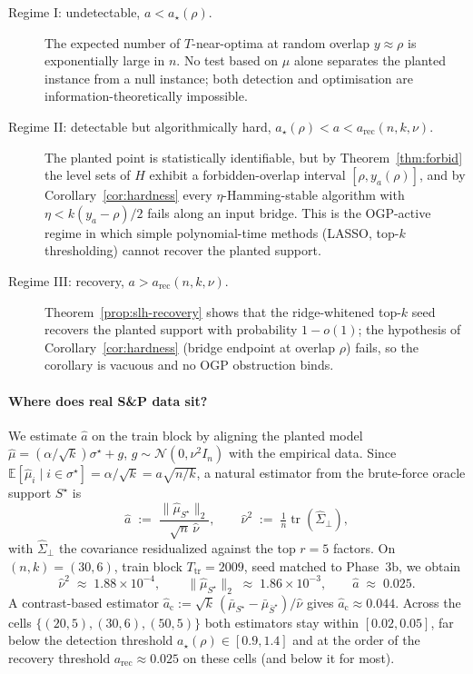\begin{description}
  \item[Regime I: undetectable, $a < a_\star(\rho)$.]
  The expected number of $T$-near-optima at random overlap $y\approx\rho$ is
  exponentially large in $n$. No test based on $\hat\mu$ alone separates the
  planted instance from a null instance; both detection and optimisation are
  information-theoretically impossible.

  \item[Regime II: detectable but algorithmically hard,
  $a_\star(\rho) < a < a_{\mathrm{rec}}(n,k,\nu)$.]
  The planted point is statistically identifiable, but by Theorem~\ref{thm:forbid}
  the level sets of $H$ exhibit a forbidden-overlap interval $[\rho, y_a(\rho)]$,
  and by Corollary~\ref{cor:hardness} every $\eta$-Hamming-stable algorithm with
  $\eta < k(y_a-\rho)/2$ fails along an input bridge. This is the OGP-active regime
  in which simple polynomial-time methods (LASSO, top-$k$ thresholding) cannot
  recover the planted support.

  \item[Regime III: recovery, $a > a_{\mathrm{rec}}(n,k,\nu)$.]
  Theorem~\ref{prop:slh-recovery} shows that the ridge-whitened top-$k$ seed
  recovers the planted support with probability $1-o(1)$; the hypothesis of
  Corollary~\ref{cor:hardness} (bridge endpoint at overlap $\rho$) fails, so the
  corollary is vacuous and no OGP obstruction binds.
\end{description}
 
\paragraph{Where does real S\&P data sit?}
We estimate $\hat a$ on the train block by aligning the planted model
$\hat\mu = (\alpha/\sqrt{k})\sigma^\star + g$, $g\sim\mathcal N(0,\nu^2 I_n)$
with the empirical data. Since $\mathbb E[\hat\mu_i \mid i\in\sigma^\star]
= \alpha/\sqrt{k} = a\sqrt{n/k}$, a natural estimator from the brute-force
oracle support $S^\star$ is
\begin{equation}\label{eq:ahat-est}
   \hat a \;:=\; \frac{\|\hat\mu_{S^\star}\|_2}{\sqrt{n}\,\hat\nu},
   \qquad
   \hat\nu^2 \;:=\; \tfrac{1}{n}\operatorname{tr}(\hat\Sigma_\perp),
\end{equation}
with $\hat\Sigma_\perp$ the covariance residualized against the top
$r{=}5$ factors. On $(n,k){=}(30,6)$, train block $T_{\mathrm{tr}}{=}2009$,
seed matched to Phase~3b, we obtain
\[
   \hat\nu^2 \;\approx\; 1.88\times 10^{-4}, \qquad
   \|\hat\mu_{S^\star}\|_2 \;\approx\; 1.86\times 10^{-3}, \qquad
   \boxed{\hat a \;\approx\; 0.025}.
\]
A contrast-based estimator
$\hat a_{\mathrm{c}} := \sqrt{k}\,(\bar\mu_{S^\star} - \bar\mu_{\bar S^\star})/\hat\nu$
gives $\hat a_{\mathrm{c}} \approx 0.044$. Across the cells $\{(20,5),
(30,6), (50,5)\}$ both estimators stay within $[0.02, 0.05]$, far below the
detection threshold $a_\star(\rho) \in [0.9, 1.4]$ and at the order of the recovery
threshold $a_{\mathrm{rec}} \approx 0.025$ on these cells (and below it for most).
 
